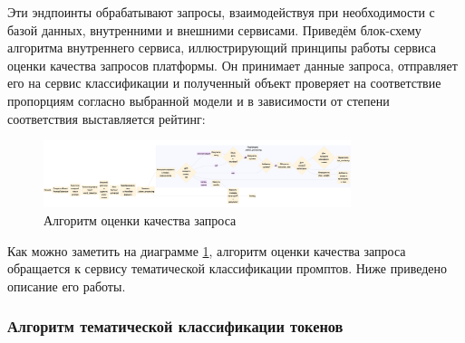 Эти эндпоинты обрабатывают запросы, взаимодействуя при необходимости с базой данных, внутренними и внешними сервисами. Приведём блок-схему алгоритма внутреннего сервиса, иллюстрирующий принципы работы сервиса оценки качества запросов платформы. Он принимает данные запроса, отправляет его на сервис классификации и полученный объект проверяет на соответствие пропорциям согласно выбранной модели и в зависимости от степени соответствия выставляется рейтинг:

\begin{figure}[htbp]
    \centering
    \includegraphics[width=0.8\textwidth]{picture/rating-algoritm.png}
    \caption{Алгоритм оценки качества запроса}
    \label{rating-algoritm}
\end{figure}

Как можно заметить на диаграмме \ref{rating-algoritm}, алгоритм оценки качества запроса обращается к сервису тематической классификации промптов.  
Ниже приведено описание его работы.

\subsubsection*{Алгоритм тематической классификации токенов}

